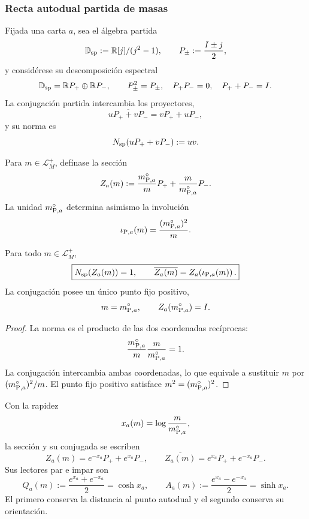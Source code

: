 \subsubsection{Recta autodual partida de masas}

Fijada una carta \(a\), sea el álgebra partida
\[
 \mathbb D_{\rm sp}:=\mathbb R[j]/(j^2-1),
 \qquad
 P_\pm:=\frac{I\pm j}{2},
\]
y considérese su descomposición espectral
\[
 \mathbb D_{\rm sp}
 =\mathbb R P_+\oplus\mathbb R P_-,
 \qquad
 P_\pm^2=P_\pm,\quad
 P_+P_-=0,\quad
 P_++P_-=I.
\]
La conjugación partida intercambia los proyectores,
\[
 \overline{uP_++vP_-}=vP_++uP_-,
\]
y su norma es
\[
 N_{\rm sp}(uP_++vP_-):=uv.
\]

Para \(m\in\mathcal L_M^+\), defínase la sección
\begin{equation}
 Z_a(m)
 :=\frac{m_{{\rm P},a}^{\circ}}{m}P_+
   +\frac{m}{m_{{\rm P},a}^{\circ}}P_- .
 \label{eq:planck-ct108-seccion-partida-masa-rev3}
\end{equation}
La unidad \(m_{{\rm P},a}^{\circ}\) determina asimismo la involución
\begin{equation}
 \iota_{{\rm P},a}(m)
 =\frac{(m_{{\rm P},a}^{\circ})^2}{m}.
 \label{eq:planck-ct108-involucion-masas-rev3}
\end{equation}

\begin{theorem}
\label{thm:planck-ct108-recta-partida-masa-rev3}
Para todo \(m\in\mathcal L_M^+\),
\begin{equation}
 \boxed{
 N_{\rm sp}(Z_a(m))=1,
 \qquad
 \overline{Z_a(m)}
 =Z_a\!\left(\iota_{{\rm P},a}(m)\right).}
 \label{eq:planck-ct108-norma-conjugacion-rev3}
\end{equation}
La conjugación posee un único punto fijo positivo,
\[
 m=m_{{\rm P},a}^{\circ},
 \qquad
 Z_a(m_{{\rm P},a}^{\circ})=I.
\]
\end{theorem}

\begin{proof}
La norma es el producto de las dos coordenadas recíprocas:
\[
 \frac{m_{{\rm P},a}^{\circ}}m
 \frac m{m_{{\rm P},a}^{\circ}}=1.
\]
La conjugación intercambia ambas coordenadas, lo que equivale a sustituir
\(m\) por \((m_{{\rm P},a}^{\circ})^2/m\). El punto fijo positivo satisface
\(m^2=(m_{{\rm P},a}^{\circ})^2\).
\end{proof}

Con la rapidez
\begin{equation}
 x_a(m)=\log\frac{m}{m_{{\rm P},a}^{\circ}},
 \label{eq:planck-ct108-rapidez-masa-rev3}
\end{equation}
la sección y su conjugada se escriben
\[
 Z_a(m)=e^{-x_a}P_++e^{x_a}P_-,
 \qquad
 \overline{Z_a(m)}
 =e^{x_a}P_++e^{-x_a}P_-.
\]
Sus lectores par e impar son
\begin{equation}
 Q_a(m):=\frac{e^{x_a}+e^{-x_a}}2=\cosh x_a,
 \qquad
 A_a(m):=\frac{e^{x_a}-e^{-x_a}}2=\sinh x_a.
 \label{eq:planck-ct108-lectores-par-impar-rev3}
\end{equation}
El primero conserva la distancia al punto autodual y el segundo conserva su
orientación.

